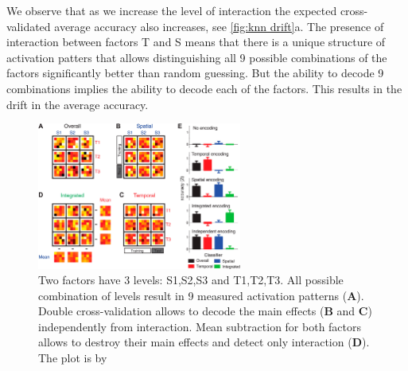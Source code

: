 \documentclass[paper=a4,fontsize=12pt]{scrartcl}
\numberwithin{equation}{section} %
\numberwithin{figure}{section} %
\numberwithin{table}{section} %
\begin{document}
We observe that as we increase the level of interaction the expected cross-validated average accuracy also increases, see \autoref{fig:knn drift}a. The presence of interaction between factors T and S means that there is a unique structure of activation patters that allows distinguishing all 9 possible combinations of the factors significantly better than random guessing. But the ability to decode 9 combinations implies the ability to decode each of the factors. This results in the drift in the average accuracy.

\begin{figure}[t]
\centering
\includegraphics[width=0.60\textwidth,clip=true,trim=0 0 28cm 0]{elife-03043-fig3-v1}
\caption{Two factors have 3 levels: S1,S2,S3 and T1,T2,T3. All possible combination of levels result in 9 measured activation patterns ({\bf A}). Double cross-validation allows to decode the main effects ({\bf B} and {\bf C}) independently from interaction. Mean subtraction for both factors allows to destroy their main effects and detect only interaction ({\bf D}). The plot is by~\cite{Kornysheva2014}}\label{fig:patterns}
\end{figure}
\end{document}
